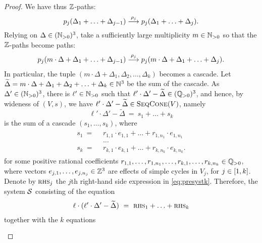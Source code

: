 \begin{appendixproof}
\begin{proof}
We have thus $\mathbb{Z}$-paths:
\[
p_j(\Delta_1 + \ldots + \Delta_{j-1}) \stackrel{\rho_j}{\longrightarrow} p_j(\Delta_1 + \ldots + \Delta_j).
\]
%
%
%
Relying on $\Delta\in(\mathbb{N}_{>0})^3$,
take a sufficiently large multiplicity $m\in\mathbb{N}_{>0}$ so that 
the $\mathbb{Z}$-paths become paths:
%
\begin{align} \label{eq:mDe}
p_j(m\cdot \Delta + \Delta_1 + \ldots + \Delta_{j-1}) \stackrel{\rho_j}{\longrightarrow} p_j(m\cdot \Delta + \Delta_1 + \ldots + \Delta_j).
\end{align}
%
In particular, the tuple
$(m\cdot\Delta + \Delta_1, \Delta_2, \ldots, \Delta_k)$ becomes a cascade.
Let 
$\widetilde \Delta = m\cdot\Delta + \Delta_1 + \Delta_2 + \ldots + \Delta_k \in \mathbb{N}^3$
be the sum of the cascade.
%
As $\Delta'\in(\mathbb{N}_{>0})^3$, there is $\ell'\in\mathbb{N}_{>0}$ such that 
$\ell'\cdot\Delta'-\widetilde \Delta \in (\mathbb{Q}_{>0})^3$,
and hence, by wideness of $(V, s)$, we have
$\ell'\cdot\Delta'-\widetilde \Delta \in \textsc{SeqCone}(V)$, namely
\[
\ell'\cdot\Delta' - \widetilde \Delta \ = \ s_1  +  \ldots  +  s_k
\]
is the sum of a cascade $(s_1, \ldots, s_k)$, where
\begin{align} \label{eq:presystk} 
\begin{aligned}
s_1 \ =  \ & \ r_{1,1} \cdot e_{1,1} + \ldots + r_{1,n_1} \cdot e_{1,n_1} \\
 & \ \ldots  \\
s_k \ = \ & \ r_{k,1} \cdot e_{k,1} + \ldots + r_{k,n_k} \cdot e_{k,n_k}.
\end{aligned}
\end{align}
for some positive rational coefficients $r_{1,1}, \ldots, r_{1,n_1}, \ldots, r_{k, 1}, \ldots, r_{k,n_k}\in \mathbb{Q}_{>0}$,
where vectors $e_{j,1}, \ldots, e_{j,n_j}\in\mathbb{Z}^3$ are effects of simple cycles in $V_j$, for $j\in[1, k]$. Denote by $\textsc{rhs}_j$ the $j$th right-hand side expression in \eqref{eq:presystk}.
%
Therefore, the system $\cal S$ consisting of the equation
\begin{align} \label{eq:eqk}
\ell \cdot (\ell'\cdot\Delta'-\widetilde\Delta)  \ = \ \textsc{rhs}_1  +  \ldots +  \textsc{rhs}_k
\end{align}
together with the $k$ equations
\begin{align} \label{eq:systk}
\begin{aligned}

\end{aligned}
\end{align}
\end{proof}
\end{appendixproof}
